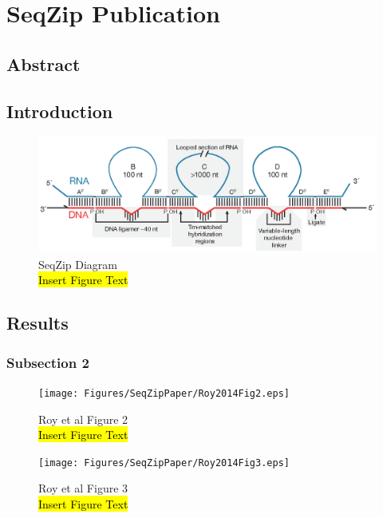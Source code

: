 \chapter{SeqZip Publication} \label{SeqZipPaper} 
\section{Abstract}\label{c1sec: Abstract}

\section{Introduction}\label{c2sec: Introduction}

	\begin{figure}[htbp] %
		\centering 
		\includegraphics{Figures/SeqZipPaper/Roy2014Fig1.eps}
		\caption[SeqZip Diagram]
		{
			SeqZip Diagram\\
			\hl{Insert Figure Text}
			}
		\label{fig:Roy2014 F1}
		\end{figure}

\section{Results}\label{c2sec: Results}

	\subsection{Subsection 2}

		\begin{figure}[htbp] %
			\centering 
			\texttt{[image: Figures/SeqZipPaper/Roy2014Fig2.eps]}
			\caption[SeqZip Diagram]
			{
				Roy et al Figure 2\\
				\hl{Insert Figure Text}
				}
			\label{fig:Roy2014 F2}
			\end{figure}

		\begin{figure}[htbp] %
			\centering 
			\texttt{[image: Figures/SeqZipPaper/Roy2014Fig3.eps]}
			\caption[SeqZip Diagram]
			{
				Roy et al Figure 3\\
				\hl{Insert Figure Text}
				}
			\label{fig:Roy2014 F3}
			\end{figure}

